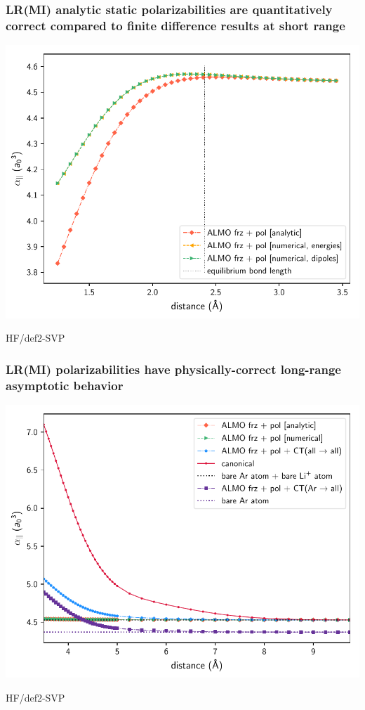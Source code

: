 \documentclass[%
    xcolor=usenames,dvipsnames,svgnames%
]{beamer}
\newenvironment{nscenter}
 {\parskip=0pt\par\nopagebreak\centering}
 {\par\noindent\ignorespacesafterend}
\begin{document}
\begin{frame}
  \frametitle{LR(MI) analytic static polarizabilities are quantitatively correct compared to finite difference results at short range}
  \begin{nscenter}
    \includegraphics[scale=0.65]{./figures/almo_analytic_vs_numerical_onaxis_projected_short_def2-SVP.pdf}
  \end{nscenter}
  {\tiny HF/def2-SVP}
\end{frame}

\begin{frame}
  \frametitle{LR(MI) polarizabilities have physically-correct long-range asymptotic behavior}
  \begin{nscenter}
    \includegraphics[scale=0.65]{./figures/long_convergence_behavior_onaxis_def2-SVP.pdf}
  \end{nscenter}
  {\tiny HF/def2-SVP}
\end{frame}
\end{document}
